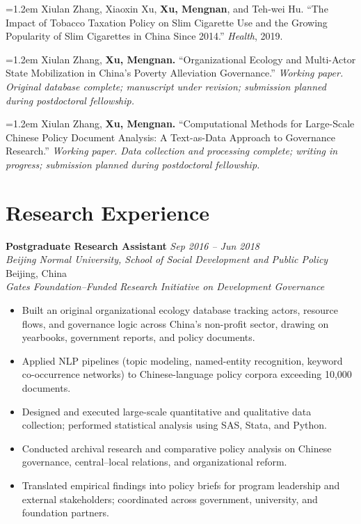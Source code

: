 \documentclass[11pt, letterpaper]{article}
\newcommand{\pubentry}[1]{%
  \noindent\hangindent=1.2em\hangafter=1 #1\par\vspace{4pt}
}
\begin{document}
\pubentry{Xiulan Zhang, Xiaoxin Xu, \textbf{Xu, Mengnan}, and Teh-wei Hu.
``The Impact of Tobacco Taxation Policy on Slim Cigarette Use and the Growing Popularity of Slim Cigarettes in China Since 2014.''
\textit{Health}, 2019.}

\pubentry{Xiulan Zhang, \textbf{Xu, Mengnan.} ``Organizational Ecology and Multi-Actor
State Mobilization in China's Poverty Alleviation Governance.''
\textit{Working paper. Original database complete; manuscript under revision;
submission planned during postdoctoral fellowship.}}

\pubentry{Xiulan Zhang, \textbf{Xu, Mengnan.} ``Computational Methods for Large-Scale
Chinese Policy Document Analysis: A Text-as-Data Approach to Governance
Research.'' \textit{Working paper. Data collection and processing complete;
writing in progress; submission planned during postdoctoral fellowship.}}

\section{Research Experience}

\noindent\textbf{Postgraduate Research Assistant}
\hfill \textit{Sep 2016 -- Jun 2018}\\
\textit{Beijing Normal University, School of Social Development and Public Policy}
\hfill Beijing, China\\
\small\textit{Gates Foundation–Funded Research Initiative on Development Governance}

\begin{itemize}
  \item Built an original organizational ecology database tracking actors,
        resource flows, and governance logic across China's non-profit sector,
        drawing on yearbooks, government reports, and policy documents.
  \item Applied NLP pipelines (topic modeling, named-entity recognition,
        keyword co-occurrence networks) to Chinese-language policy corpora
        exceeding 10,000 documents.
  \item Designed and executed large-scale quantitative and qualitative data
        collection; performed statistical analysis using SAS, Stata, and Python.
  \item Conducted archival research and comparative policy analysis on Chinese
        governance, central--local relations, and organizational reform.
  \item Translated empirical findings into policy briefs for program leadership
        and external stakeholders; coordinated across government, university,
        and foundation partners.
\end{itemize}
\end{document}

